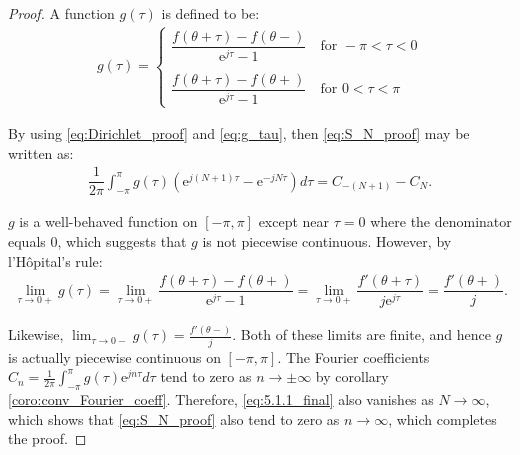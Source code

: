 \begin{proof}
	A function $g(\tau)$ is defined to be:
	\begin{align} \label{eq:g_tau}
		g(\tau) =
		\begin{cases}
			\dfrac{f(\theta + \tau) - f(\theta-)}{\text{e}^{j				\tau}-1} \quad \text{for } -\pi < \tau < 0 \\ \\
			\dfrac{f(\theta + \tau) - f(\theta+)}{\text{e}^{j				\tau}-1} \quad \text{for } 0 < \tau < \pi
		\end{cases}
	\end{align}	
	
	By using \eqref{eq:Dirichlet_proof} and \eqref{eq:g_tau}, 		then \eqref{eq:S_N_proof} may be written as:
	\begin{align} \label{eq:5.1.1_final}
		\dfrac{1}{2\pi} \int_{-\pi}^\pi g(\tau) \left(\text{e}			^{j(N+1)\tau} - \text{e}^{-jN\tau}\right) d\tau = C_{-			(N+1)} - C_N.
	\end{align}
	
	$g$ is a well-behaved function on $[-\pi,\pi]$ except near 		$\tau = 0$ where the denominator equals 0, which suggests 		that $g$ is not piecewise continuous. However, by 				l'Hôpital's rule:
	\begin{align*}
		\lim_{\tau \to 0+} g(\tau) = \lim_{\tau \to 0+} 				\dfrac{f(\theta + \tau) - f(\theta+)}{\text{e}^{j				\tau}-1} = \lim_{\tau \to 0+} \dfrac{f'(\theta + \tau)}			{j\text{e}^{j\tau}} = \dfrac{f'(\theta+)}{j}.
	\end{align*}
	
	Likewise, $\displaystyle{\lim_{\tau \to 0-}} g(\tau) = 			\frac{f'(\theta-)}{j}$. Both of these limits are finite, 		and hence $g$ is actually piecewise continuous on $[-\pi,		\pi]$. The Fourier coefficients $C_n = \frac{1}{2\pi} 			\int_{-\pi}^\pi g(\tau)\text{e}^{jn\tau} d\tau$ tend to 		zero as $n 	\to \pm \infty$ by corollary 						\ref{coro:conv_Fourier_coeff}. 	Therefore, \eqref{eq:5.1.1_final} also vanishes as $N \to \infty$, which 				shows that \eqref{eq:S_N_proof} also tend to zero as $n 		\to \infty$, which completes the proof.
\end{proof}



